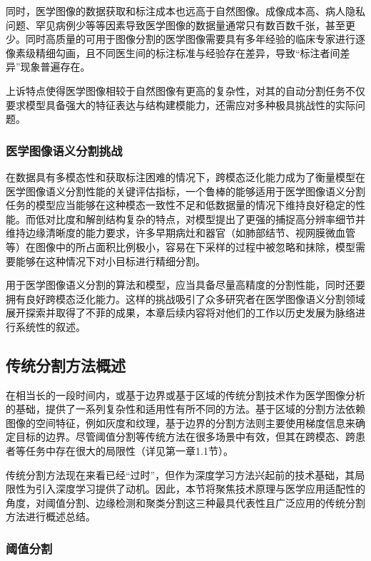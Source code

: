 同时，医学图像的数据获取和标注成本也远高于自然图像。成像成本高、病人隐私问题、罕见病例少等等因素导致医学图像的数据量通常只有数百数千张，甚至更少。同时高质量的可用于图像分割的医学图像需要具有多年经验的临床专家进行逐像素级精细勾画，且不同医生间的标注标准与经验存在差异，导致“标注者间差异”现象普遍存在。

上诉特点使得医学图像相较于自然图像有更高的复杂性，对其的自动分割任务不仅要求模型具备强大的特征表达与结构建模能力，还需应对多种极具挑战性的实际问题。

\subsubsection{医学图像语义分割挑战}

在数据具有多模态性和获取标注困难的情况下，跨模态泛化能力成为了衡量模型在医学图像语义分割性能的关键评估指标，一个鲁棒的能够适用于医学图像语义分割任务的模型应当能够在这种模态一致性不足和低数据量的情况下维持良好稳定的性能。而低对比度和解剖结构复杂的特点，对模型提出了更强的捕捉高分辨率细节并维持边缘清晰度的能力要求，许多早期病灶和器官（如肺部结节、视网膜微血管等）在图像中的所占面积比例极小，容易在下采样的过程中被忽略和抹除，模型需要能够在这种情况下对小目标进行精细分割。

用于医学图像语义分割的算法和模型，应当具备尽量高精度的分割性能，同时还要拥有良好跨模态泛化能力。这样的挑战吸引了众多研究者在医学图像语义分割领域展开探索并取得了不菲的成果，本章后续内容将对他们的工作以历史发展为脉络进行系统性的叙述。

\subsection{传统分割方法概述}

在相当长的一段时间内，或基于边界或基于区域的传统分割技术作为医学图像分析的基础，提供了一系列复杂性和适用性有所不同的方法。基于区域的分割方法依赖图像的空间特征，例如灰度和纹理，基于边界的分割方法则主要使用梯度信息来确定目标的边界。尽管阈值分割等传统方法在很多场景中有效\cite{xu2024}，但其在跨模态、跨患者等任务中存在很大的局限性（详见第一章1.1节）。

传统分割方法现在来看已经“过时”，但作为深度学习方法兴起前的技术基础，其局限性为引入深度学习提供了动机。因此，本节将聚焦技术原理与医学应用适配性的角度，对阈值分割、边缘检测和聚类分割这三种最具代表性且广泛应用的传统分割方法进行概述总结。

\subsubsection{阈值分割}

